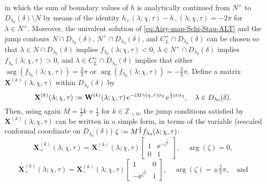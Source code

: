 in which the sum of boundary values of $h$ is analytically continued from $N^+$ to $D_{\lambda_0}(\delta)\setminus N$ by means of the identity $h_+(\lambda;\chi,\tau)-h_-(\lambda;\chi,\tau)=-2\pi$ for $\lambda\in N^+$.
Moreover, the univalent solution of \eqref{eq:Airy-map-Schi-Stau-ALT} and the jump contours $N\cap D_{\lambda_0}(\delta)$, $N^+\cap D_{\lambda_0}(\delta)$, and $C_L^+\cap D_{\lambda_0}(\delta)$ can be chosen so that $\lambda\in N\cap D_{\lambda_0}(\delta)$ implies $f_{\lambda_0}(\lambda;\chi,\tau)<0$, $\lambda\in N^+\cap D_{\lambda_0}(\delta)$ implies $f_{\lambda_0}(\lambda;\chi,\tau)>0$, and $\lambda\in C_L^+\cap D_{\lambda_0}(\delta)$ implies that either $\arg(f_{\lambda_0}(\lambda;\chi,\tau))=\tfrac{2}{3}\pi$ or $\arg(f_{\lambda_0}(\lambda;\chi,\tau))=-\tfrac{2}{3}\pi$.  
Define a matrix $\mathbf{X}^{(k)}(\lambda;\chi,\tau)$ within $D_{\lambda_0}(\delta)$ by
\begin{equation}
\mathbf{X}^{(k)}(\lambda;\chi,\tau)\vcentcolon=\mathbf{W}^{(k)}(\lambda;\chi,\tau)\,\mathrm{e}^{-\mathrm{i} M\gamma(\chi,\tau)\sigma_3}\,\mathrm{e}^{\frac{1}{4}\mathrm{i}\pi\sigma_3},\quad\lambda\in D_{\lambda_0}(\delta).
\label{eq:Y-from-X-Schi-Stau-ALT}
\end{equation}
Then, using again $M=\tfrac{1}{2}k+\tfrac{1}{4}$ for $k\in\mathbb{Z}_{>0}$, the jump conditions satisfied by 
$\mathbf{X}^{(k)}(\lambda;\chi,\tau)$
can be written in a simple form, in terms of the variable (rescaled conformal coordinate on $D_{\lambda_0}(\delta)$) 
$\zeta\vcentcolon= M^\frac{2}{3}f_{\lambda_0}(\lambda;\chi,\tau)$:
\begin{equation}
\mathbf{X}^{(k)}_+(\lambda;\chi,\tau)=\mathbf{X}^{(k)}_-(\lambda;\chi,\tau)\begin{bmatrix}1 &\ee^{-\zeta^\frac{3}{2}} \\ 0 & 1\end{bmatrix},\quad \arg(\zeta)=0,
\label{eq:Airy-jump-first}
\end{equation}
\begin{equation}
\mathbf{X}^{(k)}_+(\lambda;\chi,\tau)=\mathbf{X}^{(k)}_-(\lambda;\chi,\tau)\begin{bmatrix}1 & 0\\-\ee^{\zeta^\frac{3}{2}} & 1\end{bmatrix},\quad\arg(\zeta)=\pm\tfrac{2}{3}\pi,\quad\text{and}
\end{equation}
